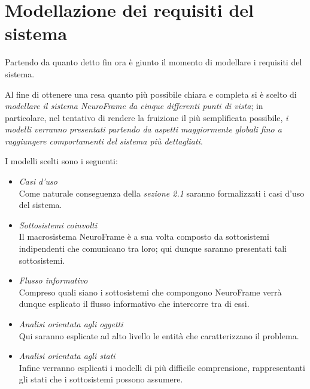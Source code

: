 \section{Modellazione dei requisiti del sistema}
Partendo da quanto detto fin ora è giunto il momento di modellare i requisiti del sistema.\newline

\noindent Al fine di ottenere una resa quanto più possibile chiara e completa si è scelto di \emph{modellare il sistema NeuroFrame da cinque differenti punti di vista}; in particolare, nel tentativo di rendere la fruizione il più semplificata possibile, \emph{i modelli verranno presentati partendo da aspetti maggiormente globali fino a raggiungere comportamenti del sistema più dettagliati}.\newline

\noindent I modelli scelti sono i seguenti:\newline
\begin{itemize}
  \item \emph{Casi d'uso}\\
  {Come naturale conseguenza della \emph{sezione 2.1} saranno formalizzati i casi d'uso del sistema.}
  \item \emph{Sottosistemi coinvolti}\\
  {Il macrosistema NeuroFrame è a sua volta composto da sottosistemi indipendenti che comunicano tra loro; qui dunque saranno presentati tali sottosistemi.}
  \item \emph{Flusso informativo}\\
  {Compreso quali siano i sottosistemi che compongono NeuroFrame verrà dunque esplicato il flusso informativo che intercorre tra di essi.}
  \item \emph{Analisi orientata agli oggetti}\\
  {Qui saranno esplicate ad alto livello le entità che caratterizzano il problema.}
  \item \emph{Analisi orientata agli stati}\\
  {Infine verranno esplicati i modelli di più difficile comprensione, rappresentanti gli stati che i sottosistemi possono assumere.}
\end{itemize}
\vspace{70mm}
